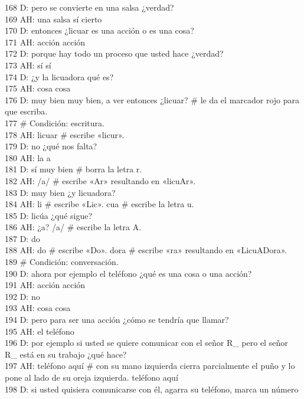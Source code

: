 168 D: pero se convierte en una salsa ¿verdad?\\
169 AH: una salsa sí cierto\\
170 D: entonces ¿licuar es una acción o es una cosa?\\
171 AH: acción acción\\
172 D: porque hay todo un proceso que usted hace ¿verdad?\\
173 AH: sí sí\\
174 D: ¿y la licuadora qué es?\\
175 AH: cosa cosa\\
176 D: muy bien muy bien, a ver entonces ¿licuar? \# le da el marcador rojo para que escriba.\\
177 \# Condición: escritura.\\
178 AH: licuar \# escribe «licur». \\
179 D: no ¿qué nos falta?\\
180 AH: la a\\
181 D: sí muy bien \# borra la letra r.\\
182 AH: /a/ \# escribe «Ar» resultando en «licuAr».\\
183 D: muy bien ¿y licuadora?\\
184 AH: li \# escribe «Lic». cua \# escribe la letra u.\\
185 D: licúa ¿qué sigue?\\
186 AH: ¿a? /a/ \# escribe la letra A.\\
187 D: do\\
188 AH: do \# escribe «Do». dora \# escribe «ra» resultando en «LicuADora».\\
189 \# Condición: conversación.\\
190 D: ahora por ejemplo el teléfono ¿qué es una cosa o una acción?\\
191 AH: acción acción\\
192 D: no\\
193 AH: cosa cosa\\
194 D: pero para ser una acción ¿cómo se tendría que llamar?\\
195 AH: el teléfono\\
196 D: por ejemplo si usted se quiere comunicar con el señor R\_ pero el señor R\_ está en su trabajo ¿qué hace?\\
197 AH: teléfono aquí \# con su mano izquierda cierra parcialmente el puño y lo pone al lado de su oreja izquierda. teléfono aquí\\
198 D: si usted quisiera comunicarse con él, agarra su teléfono, marca un número\\
